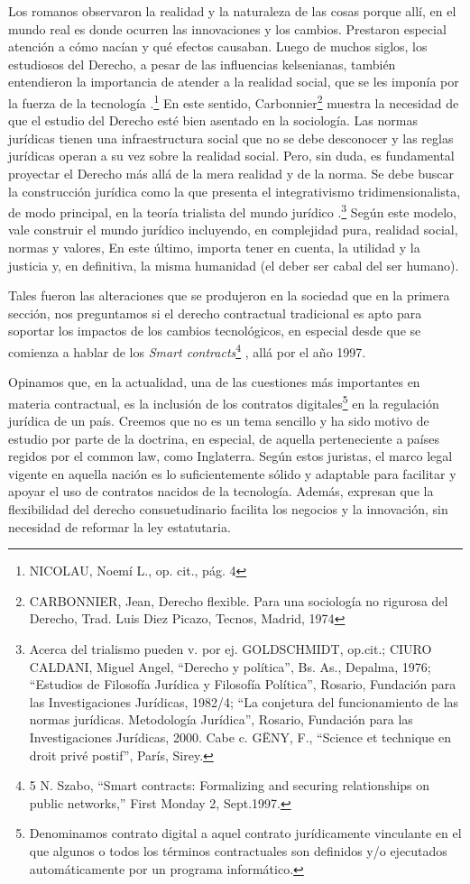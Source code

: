 \documentclass[12pt]{report} %
\begin{document}
Los romanos observaron la realidad y la naturaleza de las cosas porque allí, en el mundo real es donde ocurren las innovaciones y los cambios. Prestaron especial atención a cómo nacían y qué efectos causaban. Luego de muchos siglos, los estudiosos del Derecho, a pesar de las influencias kelsenianas, también entendieron la importancia de atender a la realidad social, que se les imponía por la fuerza de la tecnología .\footnote{NICOLAU, Noemí L., op. cit., pág. 4} En este sentido, Carbonnier\footnote{CARBONNIER, Jean, Derecho flexible. Para una sociología no rigurosa del Derecho, Trad. Luis Diez Picazo, Tecnos, Madrid, 1974}  muestra la necesidad de que el estudio del Derecho esté bien asentado en la sociología. Las normas jurídicas tienen una infraestructura social que no se debe desconocer y las reglas jurídicas operan a su vez sobre la realidad social. Pero, sin duda, es fundamental proyectar el Derecho más allá de la mera realidad y de la norma. Se debe buscar la construcción jurídica como la que presenta el integrativismo tridimensionalista, de modo principal, en la teoría trialista del mundo jurídico   .\footnote{Acerca del trialismo pueden v. por ej. GOLDSCHMIDT, op.cit.; CIURO CALDANI, Miguel Angel, “Derecho y política”, Bs. As., Depalma, 1976; “Estudios de Filosofía Jurídica y Filosofía Política”, Rosario, Fundación para las Investigaciones Jurídicas, 1982/4; “La conjetura del funcionamiento de las normas jurídicas. Metodología Jurídica”, Rosario, Fundación para las Investigaciones Jurídicas, 2000. Cabe c. GËNY, F., “Science et technique en droit privé postif”, París, Sirey.} Según este modelo, vale construir el mundo jurídico incluyendo, en complejidad pura, realidad social, normas y valores, En este último, importa tener en cuenta, la utilidad y la justicia y, en definitiva, la misma humanidad (el deber ser cabal del ser humano).

Tales fueron las alteraciones que se produjeron en la sociedad que en la primera sección, nos preguntamos si el derecho contractual tradicional es apto para soportar los impactos de los cambios tecnológicos, en especial desde que se comienza a hablar de los \textit{Smart contracts}\footnote{5 N. Szabo, “Smart contracts: Formalizing and securing relationships on public networks,” First Monday 2, Sept.1997.} , allá por el año 1997.

Opinamos  que, en la actualidad, una de las cuestiones más importantes en materia contractual, es la inclusión de los contratos digitales\footnote{Denominamos contrato digital a aquel contrato jurídicamente vinculante en el que algunos o todos los términos contractuales son definidos y/o ejecutados automáticamente por un programa informático.}  en la regulación jurídica de un país. Creemos que no es un tema sencillo y ha sido motivo de estudio por parte de la doctrina, en especial, de aquella perteneciente a países regidos por el common law, como Inglaterra. Según estos juristas, el marco legal vigente en aquella nación es lo suficientemente sólido y adaptable para facilitar y apoyar el uso de contratos nacidos de la tecnología. Además, expresan que la flexibilidad del derecho consuetudinario facilita los negocios y la innovación, sin necesidad de reformar la ley estatutaria. 
\end{document}
